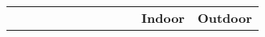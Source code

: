 \documentclass{article}
\begin{document}
\begin{latin}
\begin{table}[H]
{\begin{tabular}{|cccccccccccc|}
\multicolumn{1}{|c|}{}                                                                                               & \multicolumn{1}{c|}{}                              & \multicolumn{1}{c|}{}                                                                                          & \multicolumn{1}{c|}{}                                                                                 & \multicolumn{1}{c|}{}                                                                                    & \multicolumn{1}{c|}{}                                                                                    & \multicolumn{1}{c|}{}                                                                                              & \multicolumn{1}{c|}{}                                                                                                                                    & \multicolumn{1}{c|}{}                                                                                           & \multicolumn{1}{c|}{}                                                                                            & \multicolumn{1}{c|}{\multirow{2}{*}{\textbf{Indoor}}} & \multirow{2}{*}{\textbf{Outdoor}} \\
\multicolumn{1}{|c|}{}                                                                                               & \multicolumn{1}{c|}{}                              & \multicolumn{1}{c|}{}                                                                                          & \multicolumn{1}{c|}{}                                                                                 & \multicolumn{1}{c|}{}                                                                                    & \multicolumn{1}{c|}{}                                                                                    & \multicolumn{1}{c|}{}                                                                                              & \multicolumn{1}{c|}{}                                                                                                                                    & \multicolumn{1}{c|}{}                                                                                           & \multicolumn{1}{c|}{}                                                                                            & \multicolumn{1}{c|}{}                                 &                                   \\ \hline

\end{tabular}}
\end{table}
\end{latin}
\end{document}
